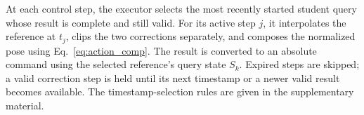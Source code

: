 At each control step, the executor selects the most recently started student query whose result is complete and still valid. For its active step $j$, it interpolates the reference at $t_j$, clips the two corrections separately, and composes the normalized pose using Eq.~\eqref{eq:action_comp}. The result is converted to an absolute command using the selected reference's query state $S_k$. Expired steps are skipped; a valid correction step is held until its next timestamp or a newer valid result becomes available. The timestamp-selection rules are given in the supplementary material.
